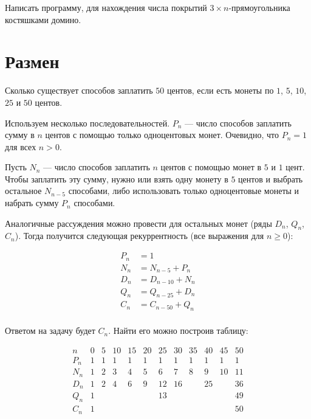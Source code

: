 \documentclass[14pt,openany]{book}
\begin{document}
\begin{task}
Написать программу, для нахождения числа покрытий $3\times n$-прямоугольника костяшками домино.
\end{task}

\section{Размен}

Сколько существует способов заплатить $50$ центов, если есть монеты по $1$, $5$, $10$, $25$ и $50$ центов.

Используем несколько последовательностей. $P_n$ --- число способов заплатить сумму в $n$ центов
с помощью только одноцентовых монет. Очевидно, что $P_n = 1$ для всех $n>0$. 

Пусть $N_n$ --- число способов заплатить $n$ центов с помощью монет в $5$ и $1$ цент.
Чтобы заплатить эту сумму, нужно или взять одну монету в $5$ центов и выбрать остальное
$N_{n-5}$ способами, либо использовать только одноцентовые монеты и набрать сумму $P_n$
способами.

Аналогичные рассуждения можно провести для остальных монет (ряды $D_n$, $Q_n$, $C_n$). 
Тогда получится следующая рекуррентность
(все выражения для $n \ge 0$):

\begin{align*}
P_n &= 1 \\
N_n &= N_{n-5} + P_n \\
D_n &= D_{n-10} + N_n \\
Q_n &= Q_{n-25} + D_n \\
C_n &= C_{n-50} + Q_n \\
\end{align*}

Ответом на задачу будет $C_n$. Найти его можно построив таблицу:

$$
\begin{array}{c|cccccccccccc}
n   & 0 & 5 & 10 & 15 & 20 & 25 & 30 & 35 & 40 & 45 & 50 \\
\hline
P_n & 1 & 1 & 1  & 1  & 1  & 1  & 1  & 1  & 1  & 1  & 1  \\
N_n & 1 & 2 & 3  & 4  & 5  & 6  & 7  & 8  & 9  & 10 & 11 \\
D_n & 1 & 2 & 4  & 6  & 9  & 12 & 16 &    & 25 &    & 36 \\
Q_n & 1 &   &    &    &    & 13 &    &    &    &    & 49 \\
C_n & 1 &   &    &    &    &    &    &    &    &    & 50 \\
\end{array}
$$
\end{document}
